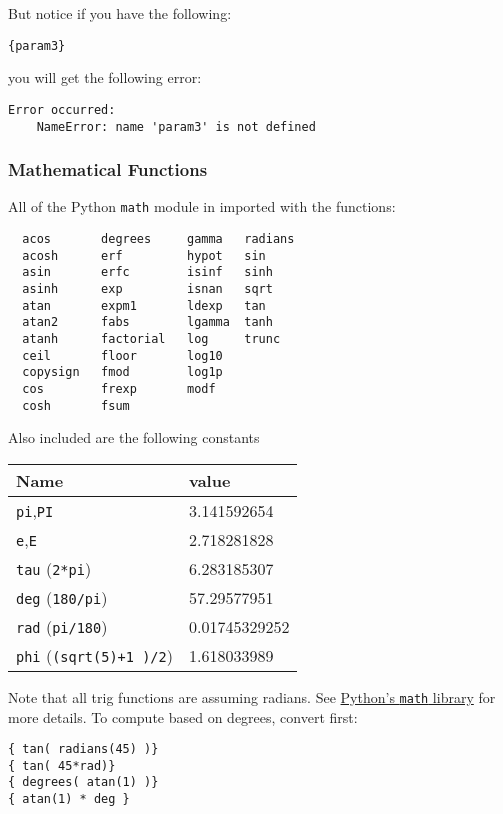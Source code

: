 But notice if you have the following:

\begin{verbatim}
{param3}
\end{verbatim}

you will get the following error:

\begin{verbatim}
Error occurred:
    NameError: name 'param3' is not defined
\end{verbatim}

\subsubsection{Mathematical Functions}\label{mathematical-functions}

All of the Python \texttt{math} module in imported with the functions:

\begin{verbatim}
  acos       degrees     gamma   radians  
  acosh      erf         hypot   sin      
  asin       erfc        isinf   sinh      
  asinh      exp         isnan   sqrt      
  atan       expm1       ldexp   tan       
  atan2      fabs        lgamma  tanh      
  atanh      factorial   log     trunc     
  ceil       floor       log10   
  copysign   fmod        log1p   
  cos        frexp       modf             
  cosh       fsum                               
\end{verbatim}

Also included are the following constants

\begin{longtable}[]{@{}ll@{}}
\toprule
Name & value\tabularnewline
\midrule
\endhead
\texttt{pi},\texttt{PI} & 3.141592654\tabularnewline
\texttt{e},\texttt{E} & 2.718281828\tabularnewline
\texttt{tau} (\texttt{2*pi}) & 6.283185307\tabularnewline
\texttt{deg} (\texttt{180/pi}) & 57.29577951\tabularnewline
\texttt{rad} (\texttt{pi/180}) & 0.01745329252\tabularnewline
\texttt{phi} (\texttt{(sqrt(5)+1\ )/2}) & 1.618033989\tabularnewline
\bottomrule
\end{longtable}

Note that all trig functions are assuming radians. See
\href{https://docs.Python.org/3/library/math.html}{Python's
\texttt{math} library} for more details. To compute based on degrees,
convert first:

\begin{verbatim}
{ tan( radians(45) )}
{ tan( 45*rad)}
{ degrees( atan(1) )}
{ atan(1) * deg }
\end{verbatim}


